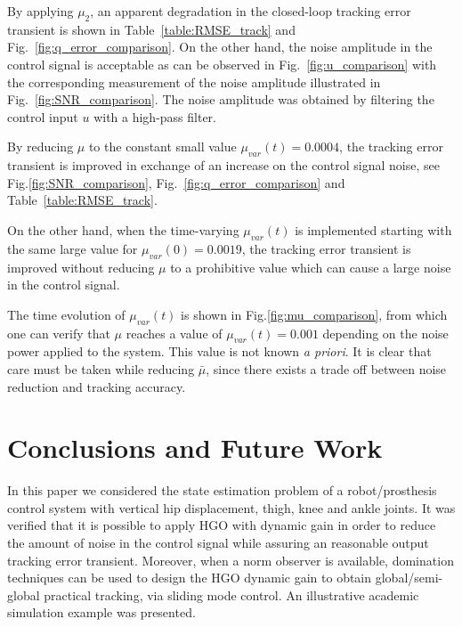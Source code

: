 \documentclass[letterpaper, 10 pt, conference]{ieeeconf}  %
\theoremstyle{plain}
\theoremstyle{definition}
\theoremstyle{remark}
\begin{document}
%
By applying $\mu_{2}$, an apparent degradation in the closed-loop tracking error transient is shown in Table~\ref{table:RMSE_track} and Fig.~\ref{fig:q_error_comparison}. On the other hand, the noise amplitude in the control signal is acceptable as can be observed in Fig.~\ref{fig:u_comparison} with the corresponding measurement of the noise amplitude illustrated in Fig.~\ref{fig:SNR_comparison}. The noise amplitude was obtained by filtering the control input $u$ with a high-pass filter.
%

%
By reducing $\mu$ to the constant small value $\mu_{var}(t) = 0.0004$, the  tracking error transient is improved in exchange of an increase on the control signal noise, see  Fig.\ref{fig:SNR_comparison}, Fig.~\ref{fig:q_error_comparison} and Table~\ref{table:RMSE_track}.
%

%
On the other hand, when the time-varying $\mu_{var}(t)$ is implemented starting with the same large value for
$\mu_{var}(0) = 0.0019$, the tracking error transient is improved without reducing $\mu$ to a prohibitive value which can cause a large noise in the control signal. 
%

%
The time evolution of $\mu_{var}(t)$ is shown in Fig.\ref{fig:mu_comparison}, from which one can verify
that $\mu$ reaches a value of $\mu_{var}(t)=0.001$ depending on the noise power applied  to the system. 
This value is not known {\em a priori}. It is clear that care must be taken while reducing $\bar{\mu}$, since there exists a trade off between noise reduction and tracking accuracy.
%
%


\section{Conclusions and Future Work}
\label{sec:Conclusions}

In this paper we considered the state estimation problem of a robot/prosthesis control system with vertical hip displacement, thigh, knee and ankle joints.  It was verified that it is possible to apply HGO with dynamic gain in order to reduce the amount of noise in the control signal while assuring an reasonable output tracking error transient. Moreover, when a norm observer is available, domination techniques can be used to design the HGO dynamic gain to obtain global/semi-global practical tracking, via sliding mode control. An illustrative academic simulation example was presented.
\end{document}
